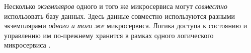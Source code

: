 \documentclass[%
	11pt,
	a4paper,
	utf8,
		]{article}
\begin{document}
Несколько \emph{экземпляров} одного и того же микросервиса могут \emph{совместно} использовать базу данных. Здесь данные совместно используются разными экземплярами \emph{одного и того же} микросервиса. Логика доступа к состоянию и управлению им по-прежнему хранится в рамках одного логического микросервиса \cite[]{microservices-2024}.











\begin{thebibliography}{99}
	
\end{thebibliography}


\end{document}
